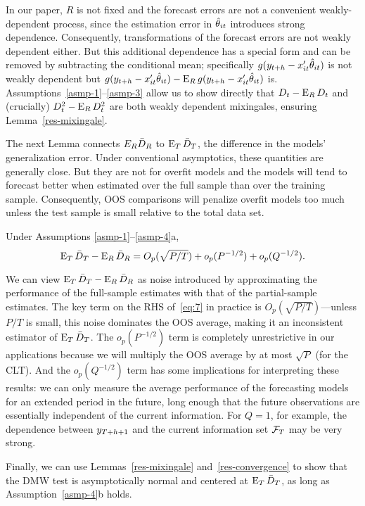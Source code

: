 \documentclass[12pt,draft]{article}
\begin{document}
In our paper, $R$ is not fixed and the forecast errors are not a
convenient weakly-dependent process, since the estimation error in
$\hat\theta_{it}$ introduces strong dependence. Consequently,
transformations of the forecast errors are not weakly dependent
either. But this additional dependence has a special form and can be
removed by subtracting the conditional mean; specifically $g(y_{t+h} -
x_{it}'\hat\theta_{it})$ is not weakly dependent but $g(y_{t+h} -
x_{it}'\hat\theta_{it}) - \operatorname{E}_R g(y_{t+h} - x_{it}'\hat\theta_{it})$ is.
Assumptions~\ref{asmp-1}--\ref{asmp-3} allow us to show directly
that $D_t - \operatorname{E}_R D_t$ and (crucially) $D^2_t - \operatorname{E}_R D_t^2$ are both
weakly dependent mixingales, ensuring Lemma~\ref{res-mixingale}.

The next Lemma connects $E_R \bar{D}_{R}$ to $\operatorname{E}_T \bar{D}_{T}$, the difference in
the models' generalization error. Under conventional asymptotics,
these quantities are generally close. But they are not for overfit
models and the models will tend to forecast better when estimated over the
full sample than over the training sample. Consequently, OOS
comparisons will penalize overfit models too much unless the test
sample is small relative to the total data set.

\begin{lem} \label{res-convergence}
  Under Assumptions \ref{asmp-1}--\ref{asmp-4}a,
  \begin{equation}\label{eq:7}
    \operatorname{E}_T \bar{D}_{T} - \operatorname{E}_R \bar{D}_{R} = O_p(\sqrt{P/T}) + o_p(P^{-1/2})
    + o_p(Q^{-1/2}).
  \end{equation}
\end{lem}
We can view $\operatorname{E}_T \bar{D}_{T} - \operatorname{E}_R \bar{D}_{R}$ as noise introduced by
approximating the performance of the full-sample estimates with that
of the partial-sample estimates. The key term on the RHS
of~\eqref{eq:7} in practice is $O_p(\sqrt{P/T})$---unless $P/T$ is
small, this noise dominates the OOS average, making it an inconsistent
estimator of $\operatorname{E}_T \bar{D}_{T}$. The $o_p(P^{-1/2})$ term is completely
unrestrictive in our applications because we will multiply the OOS
average by at most $\sqrt{P}$ (for the CLT). And the $o_p(Q^{-1/2})$
term has some implications for interpreting these results: we can only
measure the average performance of the forecasting models for an
extended period in the future, long enough that the future
observations are essentially independent of the current
information. For $Q=1$, for example, the dependence between
$y_{T+h+1}$ and the current information set $\mathcal{F}_T$ may be very
strong.

Finally, we can use Lemmas~\ref{res-mixingale}
and~\ref{res-convergence} to show that the DMW test is asymptotically
normal and centered at $\operatorname{E}_T \bar{D}_{T}$, as long as
Assumption~\ref{asmp-4}b holds.
\end{document}
